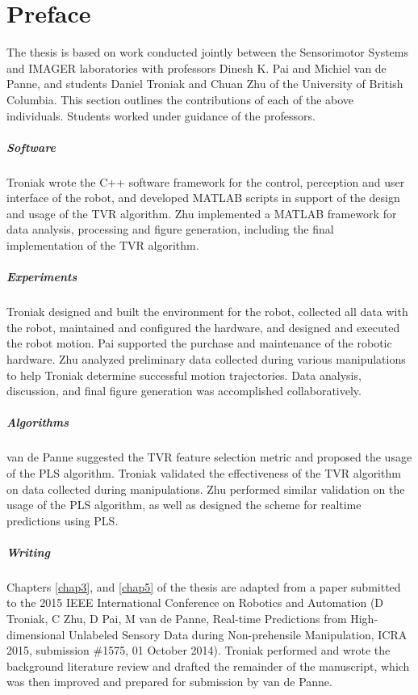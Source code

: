 \chapter{Preface} %
The thesis is based on work conducted jointly between the Sensorimotor Systems and IMAGER laboratories with professors Dinesh K. Pai and Michiel van de Panne, and students Daniel Troniak and Chuan Zhu of the University of British Columbia. This section outlines the contributions of each of the above individuals. Students worked under guidance of the professors.  

\paragraph{Software}
Troniak wrote the C++ software framework for the control, perception and user interface of the robot, and developed MATLAB scripts in support of the design and usage of the TVR algorithm. Zhu implemented a MATLAB framework for data analysis, processing and figure generation, including the final implementation of the TVR algorithm. 

\paragraph{Experiments} 
Troniak designed and built the environment for the robot, collected all data with the robot, maintained and configured the hardware, and designed and executed the robot motion. Pai supported the purchase and maintenance of the robotic hardware. Zhu analyzed preliminary data collected during various manipulations to help Troniak determine successful motion trajectories. Data analysis, discussion, and final figure generation was accomplished collaboratively.

\paragraph{Algorithms}
van de Panne suggested the TVR feature selection metric and proposed the usage of the PLS algorithm. Troniak validated the effectiveness of the TVR algorithm on data collected during manipulations. Zhu performed similar validation on the usage of the PLS algorithm, as well as designed the scheme for realtime predictions using PLS.

\paragraph{Writing}
Chapters \ref{chap3}, and \ref{chap5} of the thesis are adapted from a paper submitted to the 2015 IEEE International Conference on Robotics and Automation (D Troniak, C Zhu, D Pai, M van de Panne, Real-time Predictions from High-dimensional Unlabeled Sensory Data during Non-prehensile Manipulation, ICRA 2015, submission \#1575, 01 October 2014). Troniak performed and wrote the background literature review and drafted the remainder of the manuscript, which was then improved and prepared for submission by van de Panne.

